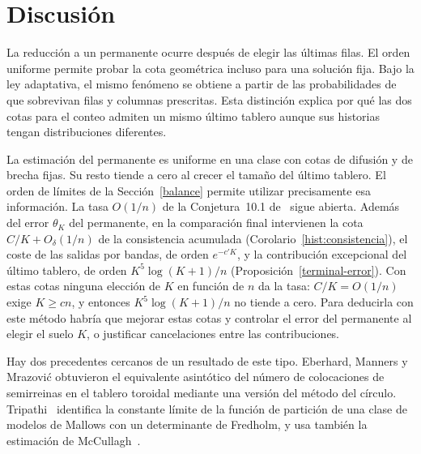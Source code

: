 \section{Discusión}
La reducción a un permanente ocurre después de elegir las últimas filas. El orden uniforme
permite probar la cota geométrica incluso para una solución fija. Bajo la ley adaptativa,
el mismo fenómeno se obtiene a partir de las probabilidades de que sobrevivan filas y columnas
prescritas. Esta distinción explica por qué las dos cotas para el conteo admiten un mismo
último tablero aunque sus historias tengan distribuciones diferentes.

La estimación del permanente es uniforme en una clase con cotas de difusión y de brecha fijas. Su resto
tiende a cero al crecer el tamaño del último tablero. El orden de límites de la
Sección~\ref{balance} permite utilizar precisamente esa información. La tasa $O(1/n)$ de la
Conjetura~10.1 de~\cite{pred} sigue abierta. Además del error $\theta_K$ del permanente, en la
comparación final intervienen la cota $C/K+O_\delta(1/n)$ de la consistencia acumulada
(Corolario~\ref{hist:consistencia}), el coste de las salidas por bandas, de orden $e^{-c'K}$, y la
contribución excepcional del último tablero, de orden $K^5\log(K+1)/n$
(Proposición~\ref{terminal-error}). Con estas cotas ninguna elección de $K$ en función de $n$ da la
tasa: $C/K=O(1/n)$ exige $K\ge cn$, y entonces $K^5\log(K+1)/n$ no tiende a cero. Para deducirla con
este método habría que mejorar estas cotas y controlar el error del permanente al elegir el suelo
$K$, o justificar cancelaciones entre las contribuciones.

Hay dos precedentes cercanos de un resultado de este tipo. Eberhard, Manners y Mrazović \cite{emm}
obtuvieron el equivalente asintótico del número de colocaciones de
semirreinas en el tablero toroidal mediante una versión del método del círculo.
Tripathi~\cite{tripathi} identifica la constante límite de la función de partición de una clase de
modelos de Mallows con un determinante de Fredholm, y usa también la estimación de
McCullagh~\cite{mccullagh}.
